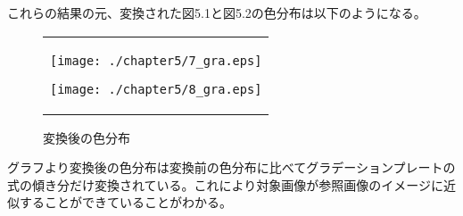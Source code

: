 \newpage
これらの結果の元、変換された図5.1と図5.2の色分布は以下のようになる。
\begin{figure}[htbp]
  \begin{center}
    \begin{tabular}{c}

      \begin{minipage}{0.45\hsize}
        \begin{center}
          \texttt{[image: ./chapter5/7\_gra.eps]}
          \caption{変換後の色分布}
          \label{fig:seininhsv}
        \end{center}
      \end{minipage}

      \begin{minipage}{0.45\hsize}
        \begin{center}
          \texttt{[image: ./chapter5/8\_gra.eps]}
          \caption{変換後の色分布}
          \label{fig:kinninhsv}
        \end{center}
      \end{minipage}


    \end{tabular}
  \end{center}
\end{figure}
 
グラフより変換後の色分布は変換前の色分布に比べてグラデーションプレートの式の傾き分だけ変換されている。これにより対象画像が参照画像のイメージに近似することができていることがわかる。


\newpage
